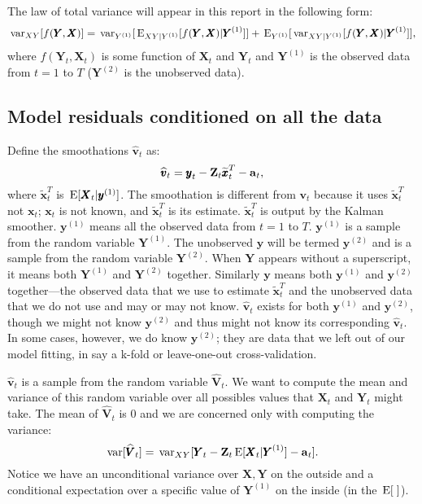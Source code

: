 \documentclass[]{article}
\def\XI{\mbox{\boldmath $\Xi$}}
\def\E{\,\textup{\textrm{E}}}
\def\VV{\mbox{$\pmb{V}$}}	\def\vv{\mbox{$\pmb{v}$}}
\def\XX{\mbox{$\pmb{X}$}}	\def\xx{\mbox{$\pmb{x}$}}
\def\YY{\mbox{$\pmb{Y}$}}	\def\yy{\mbox{$\pmb{y}$}}
\def\ZZ{\mbox{$\mathbf Z$}}	\def\zz{\mbox{$\mathbf z$}}	\def\Zb{\mbox{$\mathbf M$}} \def\Za{\mbox{$\mathbf N$}} \def\Zm{\XI}
\def\var{\,\textup{\textrm{var}}}
\def\hatxtT{\widetilde{\xx}_t^T}
\def\hatVt{\widehat{\VV}_t}
\def\hatvt{\widehat{\vv}_t}
\begin{document}
The law of total variance will appear in this report in the following form:
\begin{equation}
\var_{XY}[f(\YY,\XX)] = \var_{Y^{(1)}}[\E_{XY|Y^{(1)}}[f(\YY,\XX)|\YY^{(1)}]] + \E_{Y^{(1)}}[\var_{XY|Y^{(1)}}[f(\YY,\XX)|\YY^{(1)}]] ,
\end{equation}
where $f(\YY_t,\XX_t)$ is some function of $\XX_t$ and $\YY_t$ and $\YY^{(1)}$ is the observed data from $t=1$ to $T$ ($\YY^{(2)}$ is the unobserved data). 


\subsection{Model residuals conditioned on all the data}

Define the smoothations $\hatvt$ as:
\begin{equation}\label{eq:vtT}
\hatvt = \yy_t - \ZZ_t\hatxtT - \aa_t,
\end{equation}
where  $\hatxtT$ is $\E[\XX_t|\yy^{(1)}]$. The smoothation is different from $\vv_t$ because it uses $\hatxtT$ not $\xx_t$; $\xx_t$ is not known, and $\hatxtT$ is its estimate. $\hatxtT$ is output by the Kalman smoother. $\yy^{(1)}$ means all the observed data from $t=1$ to $T$. $\yy^{(1)}$ is a sample from the random variable $\YY^{(1)}$. The unobserved $\yy$ will be termed $\yy^{(2)}$ and is a sample from the random variable $\YY^{(2)}$. When $\YY$ appears without a superscript, it means both $\YY^{(1)}$ and $\YY^{(2)}$ together. Similarly $\yy$ means both $\yy^{(1)}$ and $\yy^{(2)}$ together---the observed data that we use to estimate $\hatxtT$ and the unobserved data that we do not use and may or may not know. $\hatvt$ exists for both $\yy^{(1)}$ and $\yy^{(2)}$, though we might not know $\yy^{(2)}$ and thus might not know its corresponding $\hatvt$. In some cases, however, we do know $\yy^{(2)}$; they are data that we left out of our model fitting, in say a k-fold or leave-one-out cross-validation.

$\hatvt$ is a sample from the random variable $\hatVt$.  We want to compute the mean and variance of this random variable over all possibles values that $\XX_t$ and $\YY_t$ might take. The mean of $\hatVt$ is 0 and we are concerned only with computing the variance:
\begin{equation}\label{eq:var.vtT}
\var[\hatVt] = \var_{XY}[\YY_t - \ZZ_t\E[\XX_t|\YY^{(1)}] - \aa_t] .
\end{equation}
Notice we have an unconditional variance over ${\XX,\YY}$ on the outside and a conditional expectation over a specific value of $\YY^{(1)}$ on the inside (in the $\E[\;]$).
\end{document}
